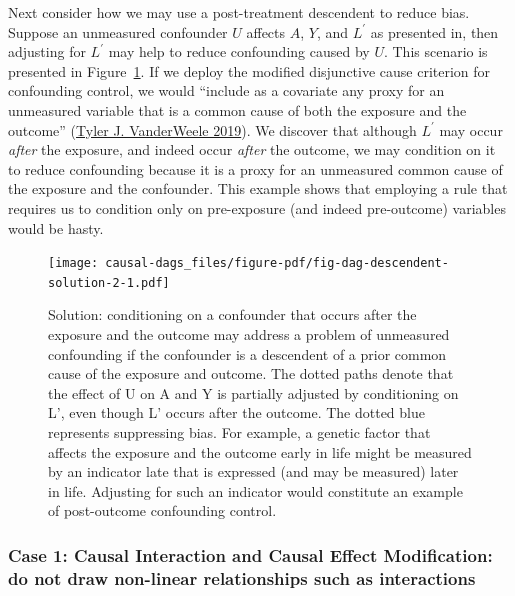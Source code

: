 \documentclass[
  singlecolumn]{article}
\begin{document}
Next consider how we may use a post-treatment descendent to reduce bias.
Suppose an unmeasured confounder \(U\) affects \(A\), \(Y\), and
\(L^\prime\) as presented in, then adjusting for \(L^\prime\) may help
to reduce confounding caused by \(U\). This scenario is presented in
Figure~\ref{fig-dag-descendent-solution-2}. If we deploy the modified
disjunctive cause criterion for confounding control, we would ``include
as a covariate any proxy for an unmeasured variable that is a common
cause of both the exposure and the outcome''
(\protect\hyperlink{ref-vanderweele2019}{Tyler J. VanderWeele 2019}). We
discover that although \(L^\prime\) may occur \emph{after} the exposure,
and indeed occur \emph{after} the outcome, we may condition on it to
reduce confounding because it is a proxy for an unmeasured common cause
of the exposure and the confounder. This example shows that employing a
rule that requires us to condition only on pre-exposure (and indeed
pre-outcome) variables would be hasty.

\begin{figure}

{\centering \texttt{[image: causal-dags\_files/figure-pdf/fig-dag-descendent-solution-2-1.pdf]}

}

\caption{\label{fig-dag-descendent-solution-2}Solution: conditioning on
a confounder that occurs after the exposure and the outcome may address
a problem of unmeasured confounding if the confounder is a descendent of
a prior common cause of the exposure and outcome. The dotted paths
denote that the effect of U on A and Y is partially adjusted by
conditioning on L', even though L' occurs after the outcome. The dotted
blue represents suppressing bias. For example, a genetic factor that
affects the exposure and the outcome early in life might be measured by
an indicator late that is expressed (and may be measured) later in life.
Adjusting for such an indicator would constitute an example of
post-outcome confounding control.}

\end{figure}

\hypertarget{case-1-causal-interaction-and-causal-effect-modification-do-not-draw-non-linear-relationships-such-as-interactions}{%
\subsubsection{Case 1: Causal Interaction and Causal Effect
Modification: do not draw non-linear relationships such as
interactions}\label{case-1-causal-interaction-and-causal-effect-modification-do-not-draw-non-linear-relationships-such-as-interactions}}
\end{document}
